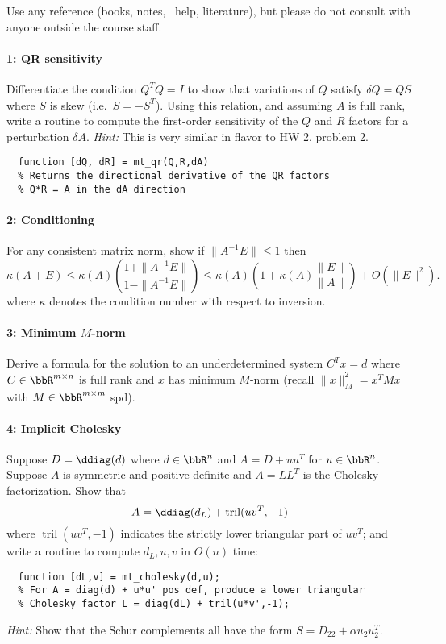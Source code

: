 \documentclass[12pt, leqno]{article} %
\newcommand{\tril}{\operatorname{tril}}
\begin{document}

Use any reference (books, notes, \matlab\ help, literature),
but please do not consult with anyone outside the course staff.

\paragraph*{1: QR sensitivity}
Differentiate the condition $Q^T Q = I$ to show that variations
of $Q$ satisfy $\delta Q = Q S$ where $S$ is skew (i.e.~$S= -S^T$).
Using this relation, and assuming $A$ is full rank,
write a routine to compute the first-order
sensitivity of the $Q$ and $R$ factors for a perturbation $\delta A$.
{\em Hint:} This is very similar in flavor to HW 2, problem 2.
\begin{lstlisting}
  function [dQ, dR] = mt_qr(Q,R,dA)
  % Returns the directional derivative of the QR factors
  % Q*R = A in the dA direction
\end{lstlisting}

\paragraph*{2: Conditioning}
For any consistent matrix norm, show if $\|A^{-1} E\| \leq 1$ then
\[
  \kappa(A+E) \leq
  \kappa(A) \left( \frac{1+\|A^{-1}E\|}{1-\|A^{-1}E\|} \right) \leq
  \kappa(A) \left( 1 + \kappa(A) \frac{\|E\|}{\|A\|} \right) + O(\|E\|^2).
\]
where $\kappa$ denotes the condition number with respect to inversion.

\paragraph*{3: Minimum $M$-norm}
Derive a formula for the solution to an underdetermined system
$C^T x = d$ where $C \in \bbR^{m \times n}$ is full rank and
$x$ has minimum $M$-norm
(recall $\|x\|_M^2 = x^T M x$ with $M \in \bbR^{m \times m}$ spd).

\paragraph*{4: Implicit Cholesky}
Suppose $D = \ddiag(d)$ where $d \in \bbR^n$
and $A = D + uu^T$ for $u \in \bbR^n$.  Suppose $A$ is symmetric
and positive definite and $A = L L^T$ is the Cholesky factorization.
Show that
\[
  A = \ddiag(d_L) + \tril(uv^T,-1)
\]
where $\tril(uv^T,-1)$ indicates the strictly lower triangular
part of $uv^T$; and write a routine to compute $d_L, u, v$ in $O(n)$
time:
\begin{lstlisting}
  function [dL,v] = mt_cholesky(d,u);
  % For A = diag(d) + u*u' pos def, produce a lower triangular
  % Cholesky factor L = diag(dL) + tril(u*v',-1);
\end{lstlisting}
{\em Hint:} Show that the Schur complements all have the form
$S = D_{22} + \alpha u_2 u_2^T.$
\end{document}
